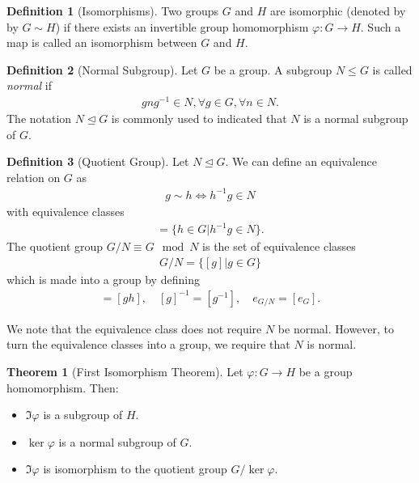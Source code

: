 \documentclass{book}
\theoremstyle{definition}
\newtheorem{defn}{Definition}[section]
\newtheorem{thm}{Theorem}[section]
\begin{document}
\begin{defn}[Isomorphisms]
	Two groups $G$ and $H$ are isomorphic (denoted by by $G\sim H$) if there exists an invertible group homomorphism $\varphi: G \to H$. Such a map is called an isomorphism between $G$ and $H$. 
\end{defn}


\begin{defn}[Normal Subgroup]
	Let $G$ be a group. A subgroup $N\leq G$ is called \textit{normal} if 
	\begin{align}
	g n g^{-1} \in N, \forall g\in G, \forall n \in N.
	\end{align}
	The notation $N \trianglelefteq G$ is commonly used to indicated that $N$ is a normal subgroup of $G$. 
\end{defn}


\begin{defn}[Quotient Group]
	Let $N \trianglelefteq G$. We can define an equivalence relation on $G$ as
	\begin{align}
	g \sim h \iff h^{-1}g \in N
	\end{align} 
	with equivalence classes
	\begin{align}
	[g] = \{  h\in G \vert h^{-1}g \in N  \}.
	\end{align}
	The quotient group $G/N \equiv G \mod N$ is the set of equivalence classes
	\begin{align}
	G/N = \{ [g] \vert g\in G  \}
	\end{align}
	which is made into a group by defining
	\begin{align}
	[g][h] = [gh], \quad [g]^{-1} = [g^{-1}], \quad e_{G/N} = [e_G].
	\end{align}
\end{defn}


We note that the equivalence class does not require $N$ be normal. However, to turn the equivalence classes into a group, we require that $N$ is normal. 







\begin{thm}[First Isomorphism Theorem]
	Let $\varphi: G \to H$ be a group homomorphism. Then:
	\begin{itemize}
		\item $\Im \varphi$ is a subgroup of $H$.
		\item $\ker\varphi$ is a normal subgroup of $G$.
		\item $\Im \varphi$ is isomorphism to the quotient group $G / \ker\varphi$.
	\end{itemize}
\end{thm}
\end{document}
